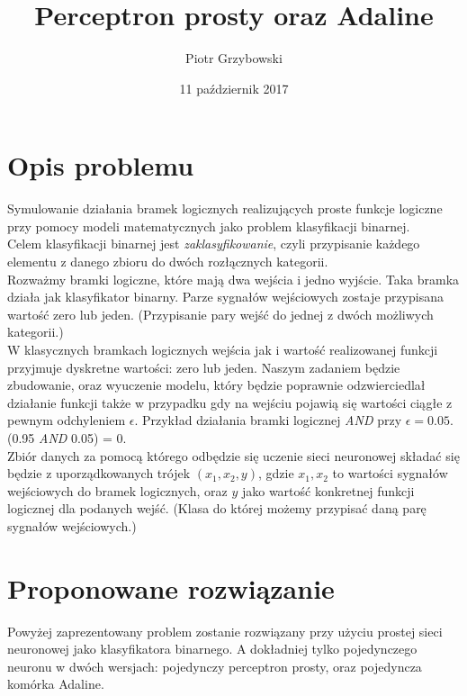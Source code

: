 \documentclass{article}
\title{Perceptron prosty oraz Adaline}
\date{11 październik 2017}
\author{Piotr Grzybowski}
\begin{document}
 
\maketitle
\newpage

\section{Opis problemu}
    Symulowanie działania bramek logicznych realizujących proste funkcje logiczne przy pomocy modeli matematycznych jako problem klasyfikacji binarnej.\\[0.3cm]
	Celem klasyfikacji binarnej jest \textit{zaklasyfikowanie}, czyli przypisanie każdego elementu z danego zbioru do dwóch rozłącznych kategorii. \\[0.3cm]     
	Rozważmy bramki logiczne, które mają dwa wejścia i jedno wyjście. Taka bramka działa jak klasyfikator binarny. Parze sygnałów wejściowych zostaje przypisana wartość zero lub jeden. (Przypisanie pary wejść do jednej z dwóch możliwych kategorii.)\\[0.3cm]
    W klasycznych bramkach logicznych wejścia jak i wartość realizowanej funkcji przyjmuje dyskretne wartości: zero lub jeden. Naszym zadaniem będzie zbudowanie, oraz wyuczenie modelu, który będzie poprawnie odzwierciedlał działanie funkcji także w przypadku gdy na wejściu pojawią się wartości ciągłe z pewnym odchyleniem $\epsilon$. Przykład działania bramki logicznej \textit{AND} przy $\epsilon = 0.05$. (0.95 \textit{AND} 0.05) = 0. \\[0.3cm]
    Zbiór danych za pomocą którego odbędzie się uczenie sieci neuronowej składać się będzie z uporządkowanych trójek $(x_1, x_2, y)$, gdzie $x_1, x_2$ to wartości sygnałów wejściowych do bramek logicznych, oraz $y$ jako wartość konkretnej funkcji logicznej dla podanych wejść. (Klasa do której możemy przypisać daną parę sygnałów wejściowych.)
    
    
\section{Proponowane rozwiązanie}
	Powyżej zaprezentowany problem zostanie rozwiązany przy użyciu prostej sieci neuronowej jako klasyfikatora binarnego. A dokładniej tylko pojedynczego neuronu w dwóch wersjach: pojedynczy perceptron prosty, oraz pojedyncza komórka Adaline.
	
\end{document}
